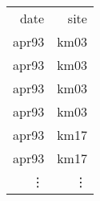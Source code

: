 \begin{tabular}{rr}
date & site \\
apr93 & km03 \\
apr93 & km03 \\
apr93 & km03 \\
apr93 & km03 \\
apr93 & km17 \\
apr93 & km17 \\
\vdots & \vdots
\end{tabular}